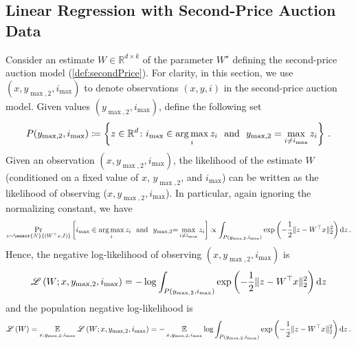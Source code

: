 \documentclass[11pt,letterpaper]{article}
\theoremstyle{plain}
\theoremstyle{definition}
\theoremstyle{remark}
\newcommand{\inbrace}[1]{\ensuremath{\left\{#1\right\}}}
\newcommand{\inparen}[1]{\ensuremath{\left(#1\right)}}
\newcommand{\insquare}[1]{\ensuremath{\left[#1\right]}}
\newcommand{\snorm}[1]{\ensuremath{\ensuremath{\| #1 \|}}}
\newcommand{\R}{\mathbb{R}}
\newcommand{\E}{\operatornamewithlimits{\mathbb{E}}}
\newcommand{\Ex}{\E}
\newcommand{\argmax}{\operatornamewithlimits{arg\,max}}
\newcommand{\customcal}[1]{\euscr{#1}}
\newcommand{\cL}{\customcal{L}}
\newcommand{\cN}{\customcal{N}}
\newcommand{\negLL}{\ensuremath{\mathscr{L}}}
\renewcommand{\d}{{\rm d}}
\newcommand{\normal}[2]{\cN{\inparen{#1,#2}}}
\renewcommand{\cL}{\negLL}
\newcommand{\smax}{\max,2} %
\newcommand{\imax}{i_{\max}}
\newcommand{\ysmax}{y_{\smax}}
\begin{document}
{{{    \subsection{Linear Regression with Second-Price Auction Data}\label{sec:hessian:2ndPrice}
        Consider an estimate $W\in \R^{d\times k}$ of the parameter $W^\star$ defining the second-price auction model (\cref{def:secondPrice}).
        For clarity, in this section, we use $(x,\ysmax,\imax)$ to denote observations $(x, y, i)$ in the second-price auction model.
        Given values $(\ysmax,\imax)$, define the following set 
        \[
            P(\ysmax, \imax)
            \coloneqq 
            \inbrace{
                z\in \R^d\colon 
                \imax\in \argmax_i z_i 
                    ~~\text{and}~~
                \ysmax = \max_{i\neq \imax} z_i
            }\,.
        \]
        Given an observation $(x,\ysmax,\imax)$, the likelihood of the estimate $W$ (conditioned on a fixed value of $x$, $\ysmax$, and $\imax$) can be written as the likelihood of observing ($x,\ysmax,\imax$).
        In particular,
        again ignoring the normalizing constant,
        we have
        \[
            \Pr_{z\sim \normal{W^\top x}{I}}
                \insquare{
                    \imax\in \argmax_i z_i
                    ~~\text{and}~~
                    \ysmax {=} \max_{i\neq \imax} z_i
                }
            \propto
            \int_{P(\ysmax, \imax)}
                \exp\inparen{-\frac{1}{2}\snorm{z- W^\top x}_2^2} \d z\,.
        \]
        Hence, the negative log-likelihood of observing $(x,\ysmax,\imax)$ is 
        \[
            \cL\inparen{W; x,\ysmax,\imax} = -\log\int_{P({\ysmax,\imax})} \exp\inparen{-\frac{1}{2}\snorm{z- W^\top x}_2^2} \d z
        \]
        and the population negative log-likelihood is
        \[
            \cL\inparen{W} 
            = \Ex_{x,\ysmax,\imax}\cL\inparen{W; x,\ysmax,\imax} 
            = -\Ex_{x,\ysmax,\imax}\log\int_{P({\ysmax,\imax})} \exp\inparen{-\frac{1}{2}\snorm{z- W^\top x}_2^2} \d z\,.
        \]
}}}
\end{document}
